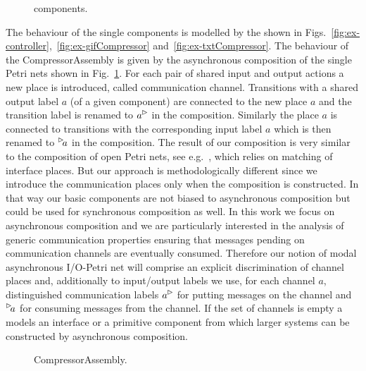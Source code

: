 \begin{figure}[h!]
	\centering
	\qquad 
		\qquad
	\caption{\MAIOPN components.}
\end{figure}

The behaviour of the single components is modelled by the \MAIOPNs shown  in Figs.~\ref{fig:ex-controller},~\ref{fig:ex-gifCompressor} and~\ref{fig:ex-txtCompressor}.
The behaviour of the \textsf{CompressorAssembly} is given by the asynchronous composition of the single Petri nets
shown in Fig.~\ref{fig:ex-async-comp}.
For each pair of shared input and output actions a new place is introduced, called communication channel.
Transitions with a shared output label $a$ (of a given component) are connected to the new place $a$ and the transition label is renamed to
$\outact{a}$ in the composition. Similarly the place $a$ is connected to transitions with the corresponding input label $a$
which is then renamed to $\inact{a}$  in the composition. 
The result of our composition is very similar to the composition of open Petri nets,
see e.g.~\cite{Lohmann07}, which relies on matching of interface places.
But our approach is methodologically different since we introduce the communication places
only when the composition is constructed. In that way our basic components are not biased to
asynchronous composition but could be used for synchronous composition as well.
In this work we focus on asynchronous composition and we are particularly interested in the analysis
of generic communication properties ensuring
that messages pending on communication channels are eventually consumed. 
Therefore our notion of modal asynchronous I/O-Petri net will comprise an explicit discrimination of
channel places and, additionally to input/output labels we use, for each channel $a$,
distinguished communication labels $\outact{a}$ for putting messages on the channel and
$\inact{a}$ for consuming messages from the channel.  If the set of channels is empty a \MAIOPN
models an interface or a primitive component from which larger systems can be constructed by asynchronous composition.

\begin{figure}[ht]
	\centering
	
	\caption{\textsf{CompressorAssembly}.\label{fig:ex-async-comp}}
\end{figure}


